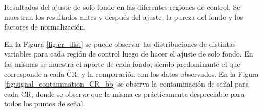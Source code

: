 \begin{table}[ht!]
  \centering
  \caption{Resultados del ajuste de solo fondo en las diferentes regiones de control. Se muestran los resultados antes y después del ajuste, la pureza del fondo y los factores de normalización.}
  
  \label{tab:bkgonly_cr}
\end{table}

En la Figura \ref{fig:cr_dist} se puede observar las distribuciones de distintas variables para cada región de control luego de hacer el ajuste de solo fondo. En las mismas se muestra el aporte de cada fondo, siendo predominante el que corresponde a cada CR, y la comparación con los datos observados. En la Figura \ref{fig:signal_contamination_CR_bb} se observa la contaminación de señal para cada CR, donde se observa que la misma es prácticamente despreciable para todos los puntos de señal.



